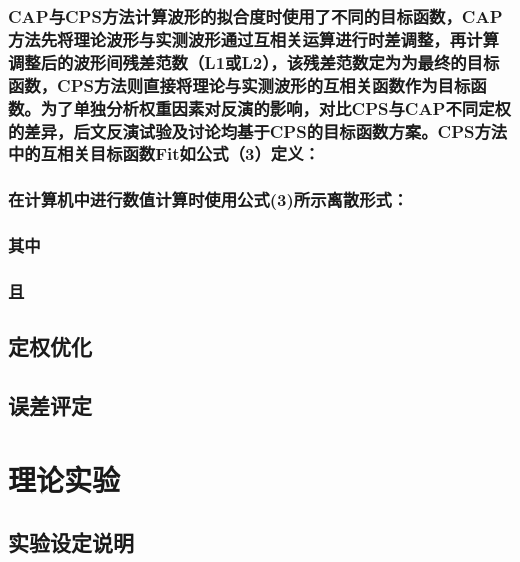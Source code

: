 \documentclass[a4paper,12pt,single,pdftex]{scrartcl}
\begin{document}
\label{ID_1321964956}\subsubsection{CAP与CPS方法计算波形的拟合度时使用了不同的目标函数，CAP方法先将理论波形与实测波形通过互相关运算进行时差调整，再计算调整后的波形间残差范数（L1或L2）\citep{Zhao1994}，该残差范数定为为最终的目标函数，CPS方法则直接将理论与实测波形的互相关函数作为目标函数。为了单独分析权重因素对反演的影响，对比CPS与CAP不同定权的差异，后文反演试验及讨论均基于CPS的目标函数方案。CPS方法中的互相关目标函数Fit如公式（3）定义：}

\label{ID_143427010}\subsubsection{在计算机中进行数值计算时使用公式(3)所示离散形式：}

\label{ID_247138940}\subsubsection{其中}

\label{ID_457268259}\subsubsection{且}

\label{ID_31082694}\subsubsection{}

\label{ID_412480889}\subsection{定权优化}

\label{ID_1192414214}\subsection{误差评定}

\label{ID_1164850097}\section{理论实验}

\label{ID_1307536851}\subsection{实验设定说明}
\end{document}

